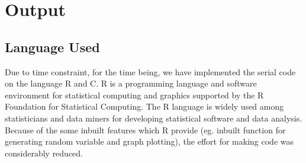 \documentclass[10pt,a4paper]{article}
\begin{document}
\section{Output}
\subsection{Language Used}
Due to time constraint, for the time being, we have implemented the serial code on the language R and C. R is a programming language and software environment for statistical computing and graphics supported by the R Foundation for Statistical Computing. The R language is widely used among statisticians and data miners for developing statistical software and data analysis.\\
Because of the some inbuilt features which R provide (eg. inbuilt function for generating random variable and graph plotting), the effort for making code was considerably reduced.
\end{document}
